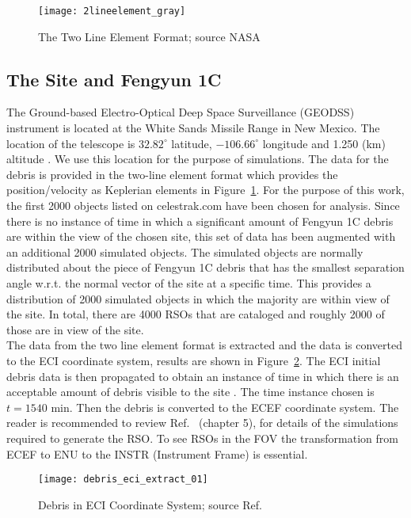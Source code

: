 \documentclass[]{aiaa-tc}%
\begin{document}
\begin{figure}[h]
\centering
\texttt{[image: 2lineelement\_gray]}
\caption{The Two Line Element Format; source NASA}
\label{TLE}
\end{figure}

\subsection{The Site and Fengyun 1C}

The Ground-based Electro-Optical Deep Space Surveillance (GEODSS) instrument is located at the White Sands Missile Range in New Mexico. The location of the telescope is $32.82^{\circ}$ latitude, $-106.66^{\circ}$ longitude and 1.250 (km) altitude \cite{silversmith}. We use this location for the purpose of simulations.
The data for the debris is provided in the two-line element format which provides the position/velocity as Keplerian elements in Figure~\ref{TLE}. For the purpose of this work, the first 2000 objects listed on celestrak.com have been chosen for analysis. Since there is no instance of time in which a significant amount of Fengyun 1C debris are within the view of the chosen site, this set of data has been augmented with an additional 2000 simulated objects. The simulated objects are normally distributed about the piece of Fengyun 1C debris that has the smallest separation angle w.r.t. the normal vector of the site at a specific
time. This provides a distribution of 2000 simulated objects in which the majority are within view of the site. In total, there are 4000 RSOs that are cataloged and roughly 2000 of those are in view of the site.\\


The data from the two line element format is extracted and the data is converted to the ECI coordinate system, results are shown in Figure~\ref{ECIDebris_1}. The ECI initial debris data is then propagated to obtain an instance of time in which there is an acceptable amount of debris visible to the site \cite{silversmith}. The time instance chosen is $t = 1540$ min. Then the debris is converted to the ECEF coordinate system. The reader is recommended to review Ref.~ (chapter 5), for details of the simulations required to generate the RSO. To see RSOs in the FOV the transformation from ECEF to ENU to the INSTR (Instrument Frame) is essential.\\

\begin{figure}[h]
\centering
\texttt{[image: debris\_eci\_extract\_01]}
\caption{Debris in ECI Coordinate System; source Ref.}
\label{ECIDebris_1}
\end{figure}
\end{document}

